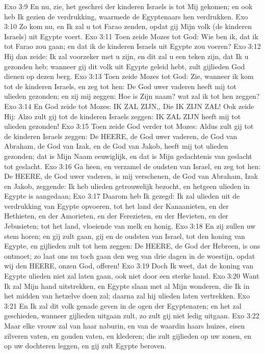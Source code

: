 Exo 3:9  En nu, zie, het geschrei der kinderen Israels is tot Mij gekomen; en ook heb Ik gezien de verdrukking, waarmede de Egyptenaars hen verdrukken.
Exo 3:10  Zo kom nu, en Ik zal u tot Farao zenden, opdat gij Mijn volk (de kinderen Israels) uit Egypte voert.
Exo 3:11  Toen zeide Mozes tot God: Wie ben ik, dat ik tot Farao zou gaan; en dat ik de kinderen Israels uit Egypte zou voeren?
Exo 3:12  Hij dan zeide: Ik zal voorzeker met u zijn, en dit zal u een teken zijn, dat Ik u gezonden heb: wanneer gij dit volk uit Egypte geleid hebt, zult gijlieden God dienen op dezen berg.
Exo 3:13  Toen zeide Mozes tot God: Zie, wanneer ik kom tot de kinderen Israels, en zeg tot hen: De God uwer vaderen heeft mij tot ulieden gezonden; en zij mij zeggen: Hoe is Zijn naam? wat zal ik tot hen zeggen?
Exo 3:14  En God zeide tot Mozes: IK ZAL ZIJN,, Die IK ZIJN ZAL! Ook zeide Hij: Alzo zult gij tot de kinderen Israels zeggen: IK ZAL ZIJN heeft mij tot ulieden gezonden!
Exo 3:15  Toen zeide God verder tot Mozes: Aldus zult gij tot de kinderen Israels zeggen: De HEERE, de God uwer vaderen, de God van Abraham, de God van Izak, en de God van Jakob, heeft mij tot ulieden gezonden; dat is Mijn Naam eeuwiglijk, en dat is Mijn gedachtenis van geslacht tot geslacht.
Exo 3:16  Ga heen, en verzamel de oudsten van Israel, en zeg tot hen: De HEERE, de God uwer vaderen, is mij verschenen, de God van Abraham, Izak en Jakob, zeggende: Ik heb ulieden getrouwelijk bezocht, en hetgeen ulieden in Egypte is aangedaan;
Exo 3:17  Daarom heb Ik gezegd: Ik zal ulieden uit de verdrukking van Egypte opvoeren, tot het land der Kanaanieten, en der Hethieten, en der Amorieten, en der Ferezieten, en der Hevieten, en der Jebusieten; tot het land, vloeiende van melk en honig.
Exo 3:18  En zij zullen uw stem horen; en gij zult gaan, gij en de oudsten van Israel, tot den koning van Egypte, en gijlieden zult tot hem zeggen: De HEERE, de God der Hebreen, is ons ontmoet; zo laat ons nu toch gaan den weg van drie dagen in de woestijn, opdat wij den HEERE, onzen God, offeren!
Exo 3:19  Doch Ik weet, dat de koning van Egypte ulieden niet zal laten gaan, ook niet door een sterke hand.
Exo 3:20  Want Ik zal Mijn hand uitstrekken, en Egypte slaan met al Mijn wonderen, die Ik in het midden van hetzelve doen zal; daarna zal hij ulieden laten vertrekken.
Exo 3:21  En Ik zal dit volk genade geven in de ogen der Egyptenaren; en het zal geschieden, wanneer gijlieden uitgaan zult, zo zult gij niet ledig uitgaan.
Exo 3:22  Maar elke vrouw zal van haar naburin, en van de waardin haars huizes, eisen zilveren vaten, en gouden vaten, en klederen; die zult gijlieden op uw zonen, en op uw dochteren leggen, en gij zult Egypte beroven.
